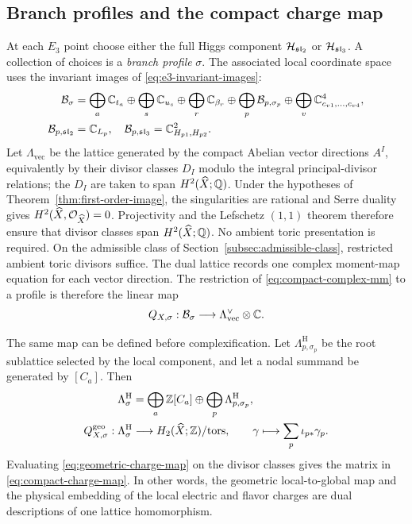 \subsection{Branch profiles and the compact charge map}
\label{subsec:branch-profiles}

At each $E_3$ point choose either the full Higgs component
$\mathcal H_{\mathfrak{sl}_2}$ or $\mathcal H_{\mathfrak{sl}_3}$. A collection of choices
is a \emph{branch profile} $\sigma$. The associated local coordinate space
uses the invariant images of \eqref{eq:e3-invariant-images}:
\begin{equation}
 \begin{aligned}
 \mathcal B_{\sigma}
 &=\bigoplus_a\mathbb C_{t_a}\oplus\bigoplus_s\mathbb C_{u_s}
  \oplus\bigoplus_r\mathbb C_{\beta_r}
  \oplus\bigoplus_p \mathcal B_{p,\sigma_p}
  \oplus\bigoplus_v\mathbb C^4_{c_{v1},\ldots,c_{v4}},\\
 \mathcal B_{p,\mathfrak{sl}_2}&=\mathbb C_{L_p},
 \quad
 \mathcal B_{p,\mathfrak{sl}_3}=\mathbb C^2_{H_{p1},H_{p2}}.
 \end{aligned}
 \label{eq:profile-space}
\end{equation}
Let $\Lambda_{\mathrm{vec}}$ be the lattice generated by the compact
Abelian vector directions $A^I$, equivalently by their divisor classes
$D_I$ modulo the integral principal-divisor relations; the $D_I$ are taken to
span $H^2(\widehat X;\mathbb Q)$. Under the hypotheses of
Theorem~\ref{thm:first-order-image}, the singularities are rational and
Serre duality gives $H^2(\widehat X,\mathcal O_{\widehat X})=0$. Projectivity and the
Lefschetz $(1,1)$ theorem therefore ensure that divisor classes span
$H^2(\widehat X;\mathbb Q)$. No ambient toric presentation is required. On the admissible
class of Section~\ref{subsec:admissible-class}, restricted ambient toric
divisors suffice. The dual lattice records one complex moment-map equation for each vector
direction. The restriction of
\eqref{eq:compact-complex-mm} to a profile is therefore the linear map
\begin{equation}
 Q_{X,\sigma}:\mathcal B_{\sigma}\longrightarrow
 \Lambda_{\mathrm{vec}}^{\vee}\otimes\mathbb C.
 \label{eq:compact-charge-map}
\end{equation}

The same map can be defined before complexification. Let
$\Lambda^{\mathrm H}_{p,\sigma_p}$ be the root sublattice selected by the
local component, and let a nodal summand be generated by $[C_a]$. Then
\begin{equation}
 \begin{split}
 \Lambda^{\mathrm H}_{\sigma}
 &=\bigoplus_a\mathbb Z[C_a]
   \oplus\bigoplus_p\Lambda^{\mathrm H}_{p,\sigma_p},\\
 Q^{\mathrm{geo}}_{X,\sigma}:\Lambda^{\mathrm H}_{\sigma}
 &\longrightarrow H_2(\widehat X;\mathbb Z)/\mathrm{tors},
 \qquad
 \gamma\longmapsto\sum_p\iota_{p*}\gamma_p .
 \end{split}
 \label{eq:geometric-charge-map}
\end{equation}
Evaluating \eqref{eq:geometric-charge-map} on the divisor classes gives the
matrix in \eqref{eq:compact-charge-map}. In other words, the geometric
local-to-global map and the physical embedding of the local electric and
flavor charges are dual descriptions of one lattice homomorphism.


